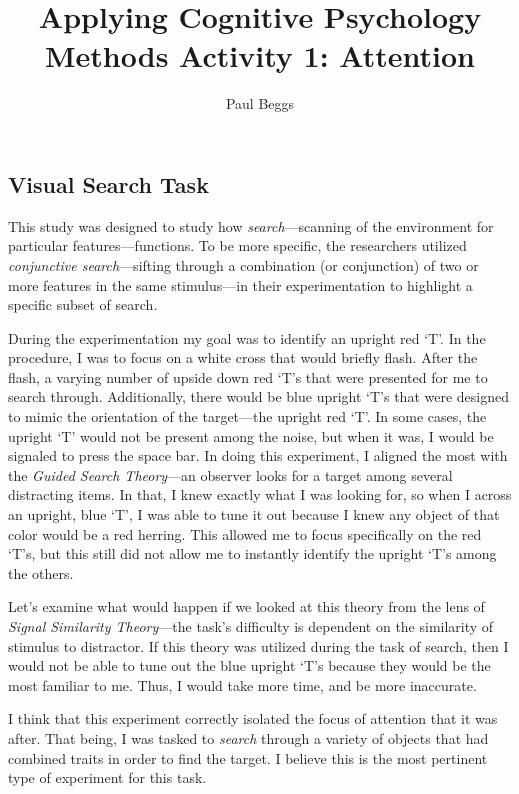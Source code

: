 \documentclass[stu,12pt,floatsintext]{apa7}
\title{Applying Cognitive Psychology Methods Activity 1: Attention} %
\author{Paul Beggs}
\affiliation{Department of Psychology, Hendrix College}
\begin{document}
\maketitle %

\subsection{Visual Search Task}

    This study was designed to study how \textit{search}---scanning of the environment for particular features---functions. To be more specific, the researchers utilized \hypertarget{Conjunction}{\textit{conjunctive search}}---sifting through a combination (or conjunction) of two or more features in the same stimulus---in their experimentation to highlight a specific subset of search.

    During the experimentation my goal was to identify an upright red `T'. In the procedure, I was to focus on a white cross that would briefly flash. After the flash, a varying number of upside down red `T's that were presented for me to search through. Additionally, there would be blue upright `T's that were designed to mimic the orientation of the target---the upright red `T'. In some cases, the upright `T' would not be present among the noise, but when it was, I would be signaled to press the space bar. In doing this experiment, I aligned the most with the \textit{Guided Search Theory}---an observer looks for a target among several distracting items. In that, I knew exactly what I was looking for, so when I across an upright, blue `T', I was able to tune it out because I knew any object of that color would be a red herring. This allowed me to focus specifically on the red `T's, but this still did not allow me to instantly identify the upright `T's among the others. 

    Let's examine what would happen if we looked at this theory from the lens of \textit{Signal Similarity Theory}---the task's difficulty is dependent on the similarity of stimulus to distractor. If this theory was utilized during the task of search, then I would not be able to tune out the blue upright `T's because they would be the most familiar to me. Thus, I would take more time, and be more inaccurate. 

    I think that this experiment correctly isolated the focus of attention that it was after. That being, I was tasked to \textit{search} through a variety of objects that had combined traits in order to find the target. I believe this is the most pertinent type of experiment for this task.
\end{document}
